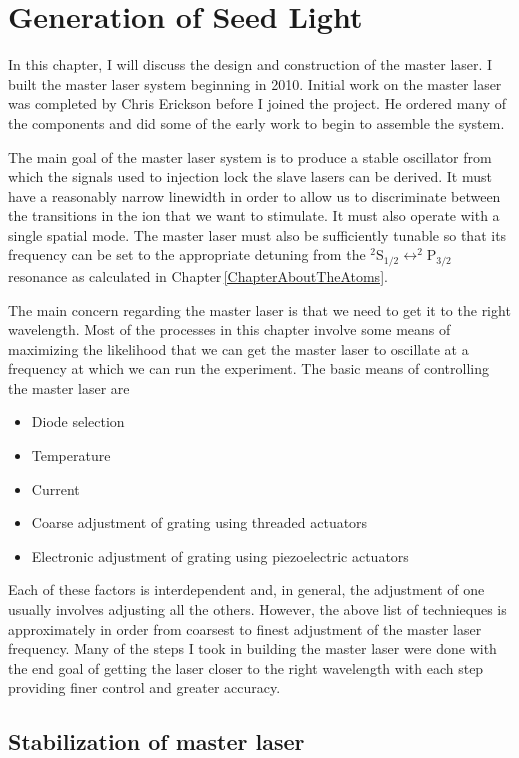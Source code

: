 \chapter{Generation of Seed Light}\label{generationOfSeedLight}

In this chapter, I will discuss the design and construction of the master laser. I built the master laser system beginning in 2010. Initial work on the master laser was completed by Chris Erickson before I joined the project. He ordered many of the components and did some of the early work to begin to assemble the system.

The main goal of the master laser system is to produce a stable oscillator from which the signals used to injection lock the slave lasers can be derived. It must have a reasonably narrow linewidth in order to allow us to discriminate between the transitions in the ion that we want to stimulate. It must also operate with a single spatial mode. The master laser must also be sufficiently tunable so that its frequency can be set to the appropriate detuning from the $^2$S$_{1/2}\leftrightarrow^2$P$_{3/2}$ resonance as calculated in Chapter\,\ref{ChapterAboutTheAtoms}.

The main concern regarding the master laser is that we need to get it to the right wavelength. Most of the processes in this chapter involve some means of maximizing the likelihood that we can get the master laser to oscillate at a frequency at which we can run the experiment. The basic means of controlling the master laser are
\begin{itemize}
\item Diode selection
\item Temperature 
\item Current
\item Coarse adjustment of grating using threaded actuators
\item Electronic adjustment of grating using piezoelectric actuators
\end{itemize}
Each of these factors is interdependent and, in general, the adjustment of one usually involves adjusting all the others. However, the above list of technieques is approximately in order from coarsest to finest adjustment of the master laser frequency. Many of the steps I took in building the master laser were done with the end goal of getting the laser closer to the right wavelength with each step providing finer control and greater accuracy.

\section{Stabilization of master laser}
